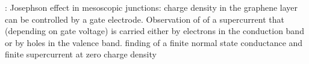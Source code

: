 \cite{Heersche2007}: Josephson effect in mesoscopic junctions: charge density in the graphene layer can be controlled by a gate electrode. Observation of of a supercurrent that (depending on gate voltage) is carried either by electrons in the conduction band or by holes in the valence band. finding of a finite normal state conductance and finite supercurrent at zero charge density

